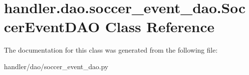 \hypertarget{classhandler_1_1dao_1_1soccer__event__dao_1_1_soccer_event_d_a_o}{}\section{handler.\+dao.\+soccer\+\_\+event\+\_\+dao.\+Soccer\+Event\+D\+AO Class Reference}
\label{classhandler_1_1dao_1_1soccer__event__dao_1_1_soccer_event_d_a_o}


The documentation for this class was generated from the following file\+:\begin{DoxyCompactItemize}
\item 
handler/dao/soccer\+\_\+event\+\_\+dao.\+py\end{DoxyCompactItemize}
